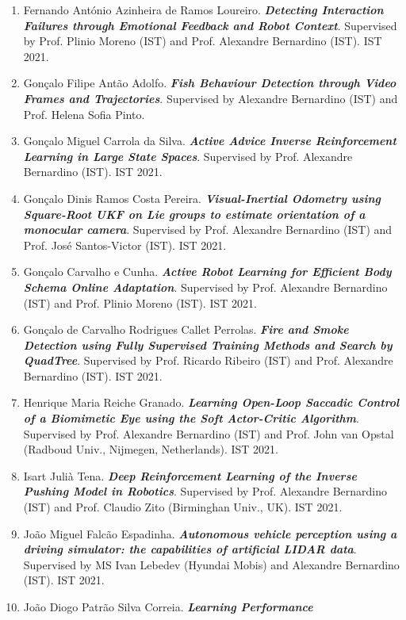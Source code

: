 \documentclass[
]{article}
\begin{document}
\begin{enumerate}
  Alexandre Bernardino (IST). IST 2021.
\item
  Fernando António Azinheira de Ramos Loureiro. \emph{\textbf{Detecting
  Interaction Failures through Emotional Feedback and Robot Context}}.
  Supervised by Prof. Plinio Moreno (IST) and Prof. Alexandre Bernardino
  (IST). IST 2021.
\item
  Gonçalo Filipe Antão Adolfo. \emph{\textbf{Fish Behaviour Detection
  through Video Frames and Trajectories}}. Supervised by Alexandre
  Bernardino (IST) and Prof. Helena Sofia Pinto.
\item
  Gonçalo Miguel Carrola da Silva. \emph{\textbf{Active Advice Inverse
  Reinforcement Learning in Large State Spaces}}. Supervised by Prof.
  Alexandre Bernardino (IST). IST 2021.
\item
  Gonçalo Dinis Ramos Costa Pereira. \emph{\textbf{Visual-Inertial
  Odometry using Square-Root UKF on Lie groups to estimate orientation
  of a monocular camera}}. Supervised by Prof. Alexandre Bernardino
  (IST) and Prof. José Santos-Victor (IST). IST 2021.
\item
  Gonçalo Carvalho e Cunha. \emph{\textbf{Active Robot Learning for
  Efficient Body Schema Online Adaptation}}. Supervised by Prof.
  Alexandre Bernardino (IST) and Prof. Plinio Moreno (IST). IST 2021.
\item
  Gonçalo de Carvalho Rodrigues Callet Perrolas. \emph{\textbf{Fire and
  Smoke Detection using Fully Supervised Training Methods and Search by
  QuadTree}}. Supervised by Prof. Ricardo Ribeiro (IST) and Prof.
  Alexandre Bernardino (IST). IST 2021.
\item
  Henrique Maria Reiche Granado. \emph{\textbf{Learning Open-Loop
  Saccadic Control of a Biomimetic Eye using the Soft Actor-Critic
  Algorithm}}. Supervised by Prof. Alexandre Bernardino (IST) and Prof.
  John van Opstal (Radboud Univ., Nijmegen, Netherlands). IST 2021.
\item
  Isart Julià Tena. \emph{\textbf{Deep Reinforcement Learning of the
  Inverse Pushing Model in Robotics}}. Supervised by Prof. Alexandre
  Bernardino (IST) and Prof. Claudio Zito (Birminghan Univ., UK). IST
  2021.
\item
  João Miguel Falcão Espadinha. \emph{\textbf{Autonomous vehicle
  perception using a driving simulator: the capabilities of artificial
  LIDAR data}}. Supervised by MS Ivan Lebedev (Hyundai Mobis) and
  Alexandre Bernardino (IST). IST 2021.
\item
  João Diogo Patrão Silva Correia. \emph{\textbf{Learning Performance
}}
\end{enumerate}
\end{document}
